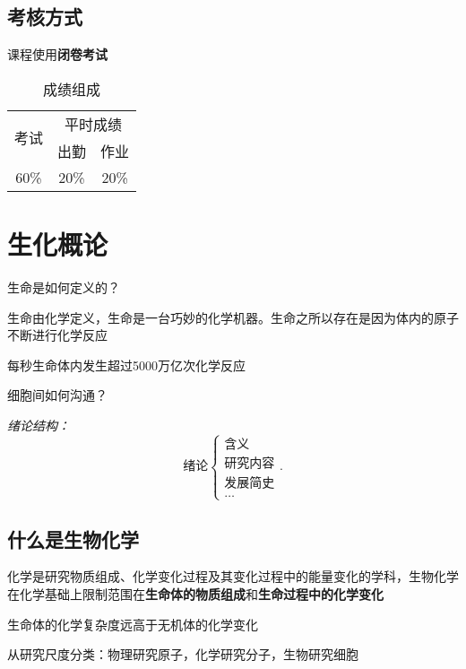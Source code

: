 \subsection{考核方式}%
\label{sub:考核方式}
课程使用\textbf{闭卷考试}
\begin{table}[htpb]
    \centering
    \caption{成绩组成}
    \label{tab:成绩组成}
    \begin{tabular}{ccc}
    \toprule
    \multirow{2}{*}{考试} & \multicolumn{2}{c}{平时成绩}\\
                          & 出勤 & 作业\\
    \midrule
    60\% & 20\% & 20\%\\
    \bottomrule
    \end{tabular}
\end{table}
\section{生化概论}%
\label{sec:生化概论}
\begin{question}
    生命是如何定义的？
\end{question}
\begin{sol}
    生命由化学定义，生命是一台巧妙的化学机器。生命之所以存在是因为体内的原子不断进行化学反应
\end{sol}
\begin{notation}
    每秒生命体内发生超过5000万亿次化学反应
\end{notation}
\begin{question}
细胞间如何沟通？
\end{question}
\textit{绪论结构：}
\[
    \text{绪论}
    \begin{cases}
        \text{含义}\\
        \text{研究内容}\\
        \text{发展简史}\\
        \ldots 
    \end{cases}
.\]
\subsection{什么是生物化学}%
\label{sub:什么是生物化学}
\begin{defi}
    化学是研究物质组成、化学变化过程及其变化过程中的能量变化的学科，生物化学在化学基础上限制范围在\textbf{生命体的物质组成}和\textbf{生命过程中的化学变化}
\end{defi}
\begin{notation}
    生命体的化学复杂度远高于无机体的化学变化
\end{notation}
从研究尺度分类：物理研究原子，化学研究分子，生物研究细胞

